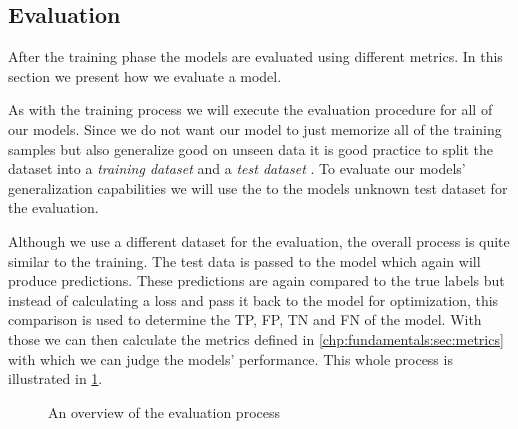 \subsection{Evaluation}
\label{chp:study:sec:design:subsec:evaluation}
After the training phase the models are evaluated using different metrics.
In this section we present how we evaluate a model.

As with the training process we will execute the evaluation procedure for all of our models.
Since we do not want our model to just memorize all of the training samples but also generalize good on unseen data it is good practice to split the dataset into a \textit{training dataset} and a \textit{test dataset} \parencite{Reitermanova:2010}.
To evaluate our models' generalization capabilities we will use the to the models unknown test dataset for the evaluation.

Although we use a different dataset for the evaluation, the overall process is quite similar to the training.
The test data is passed to the model which again will produce predictions.
These predictions are again compared to the true labels but instead of calculating a loss and pass it back to the model for optimization, this comparison is used to determine the \ac{TP}, \ac{FP}, \ac{TN} and \ac{FN} of the model.
With those we can then calculate the metrics defined in \cref{chp:fundamentals:sec:metrics} with which we can judge the models' performance.
This whole process is illustrated in \cref{fig:study:design:evaluation}.

\begin{figure}[htpb]
    \centering
    \def\svgwidth{\columnwidth}
    
    \caption[Study Design: Evaluation]{An overview of the evaluation process}\label{fig:study:design:evaluation}
\end{figure}
